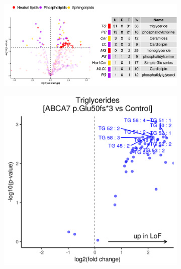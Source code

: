 \begin{figure}[ht]
\begin{subfigure}[t]{.15\textwidth}
    \end{subfigure}  
    \begin{subfigure}[t]{.5\textwidth}
        \caption{}
        \includegraphics[width=\textwidth]{./main_plots/iN_lipids_overview.png}        
    \end{subfigure}   
    \begin{subfigure}[t]{.24\textwidth}
        \caption{}
        \includegraphics[width=\textwidth]{./main_plots/tg_volcano.png}        
    \end{subfigure} 
    \begin{subfigure}[t]{.24\textwidth}
        \caption{}

\end{subfigure}
\end{figure}
